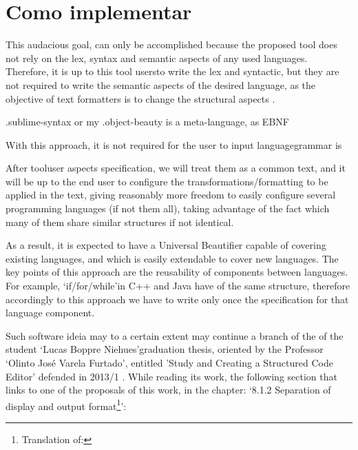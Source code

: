 \section{Como implementar}

This audacious goal,
can only be accomplished because the proposed tool does not rely on the lex,
syntax and semantic aspects
of any used languages.
Therefore,
it is up to this tool users\s to write the lex and syntactic,
but they are not required to write the semantic aspects of the desired language,
as the objective of text formatters is to change the structural aspects
.



.sublime-syntax or my .object-beauty is a meta-language, as EBNF

With this approach, it is not required for the user to input language\s grammar is

 After tool\s user aspects specification, we will treat them as a common text,
and it will be up to the end user to configure the transformations/formatting to be applied in the text,
giving reasonably more freedom to easily configure several programming languages (if not them all),
taking advantage of the fact which many of them share similar structures if not identical.

As a result, it is expected to have a Universal Beautifier capable of
covering existing languages, and which is easily extendable to cover new
languages. The key points of this approach are the reusability of components
between languages. For example, `if/for/while'\s in C++ and Java have of the
same structure, therefore accordingly to this approach we have to write only
once the specification for that language component.

Such software ideia may to a certain extent may continue a branch of the of
the student `Lucas Boppre Niehues'\s graduation thesis, oriented by the
Professor `Olinto José Varela Furtado', entitled 'Study and Creating a
Structured Code Editor' defended in 2013/1 \cite{structuredEditorStudy}.
While reading its work, the following section that links to one of the
proposals of this work, in the chapter: `8.1.2 Separation of display and
output format\footnote{Translation of: }':

